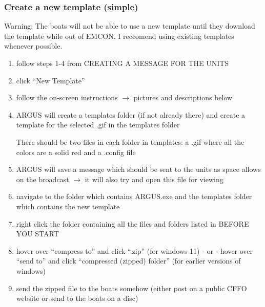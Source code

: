 \subsubsection{Create a new template (simple)}
\begin{addwarn}
    Warning: The boats will not be able to use a new template until they download the template while out of EMCON. I reccomend using existing templates whenever possible.
\end{addwarn}
\begin{enumerate}
    \item follow steps 1-4 from CREATING A MESSAGE FOR THE UNITS
    \item click ``New Template''
    \item follow the on-screen instructions $\rightarrow$ pictures and descriptions below
    \item ARGUS will create a templates folder (if not already there) and create a template for the selected .gif in the templates folder
    \begin{addnote} There should be two files in each folder in templates: a .gif where all the colors are a solid red and a .config file \end{addnote}
    \item ARGUS will save a message which should be sent to the units as space allows on the broadcast $\rightarrow$ it will also try and open this file for viewing
    \item navigate to the folder which contains ARGUS.exe and the templates folder which contains the new template
    \item right click the folder containing all the files and folders listed in BEFORE YOU START
    \item hover over ``compress to'' and click ``.zip'' (for windows 11) - or - hover over ``send to'' and click ``compressed (zipped) folder'' (for earlier versions of windows)
    \item send the zipped file to the boats somehow (either post on a public CFFO website or send to the boats on a disc)
\end{enumerate}


\newpage
